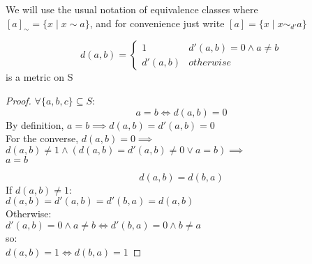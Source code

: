 	We will use the usual notation of equivalence classes where \\
	$[a]_{\sim} = \{x \mid x \sim a \}$, and for convenience just write $[a] = \{x \mid x \sim_{d'} a\}$

\newpage

	\begin{proposition}
		\[ d(a, b) = \begin{cases}
			1 & d'(a,b)=0 \land a \neq b \\
			d'(a,b) & otherwise
		\end{cases}
		\] is a metric on S
	\end{proposition}
	\begin{proof} $\forall \{a, b, c\} \subseteq S$:
		\begin{equation} \label{statement:4}
			a = b \iff d(a, b)=0
		\end{equation}
		By definition, $a=b \implies d(a, b) = d'(a, b) = 0$ \\
		For the converse, $d(a, b) = 0 \implies $ \\
		$ d(a, b) \neq 1 \land ( d(a, b) = d'(a, b) \neq 0 \lor a=b) \implies $ \\
		$ a = b $
		
		\begin{equation} \label{statement:5}
			d(a, b) = d(b, a)
		\end{equation}
		If $d(a, b) \neq 1$: \\
		$d(a, b) = d'(a, b) = d'(b, a) = d(a, b) $ \\
		Otherwise: \\
		$d'(a,b)=0 \land a \neq b \iff d'(b,a)=0 \land b \neq a $ \\
		so: \\
		$d(a, b)=1 \iff d(b, a)=1$
		

\end{proof}
